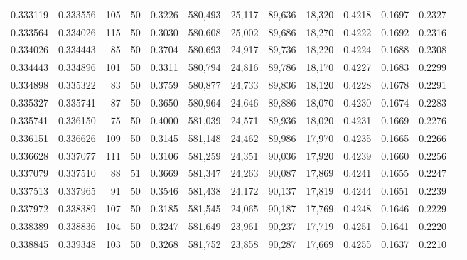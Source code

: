 \begin{tabular}{rrrrrrrrrrrrr}
0.333119 & 0.333556 &   105 &  50 &                                     0.3226 & 580,493 &  25,117 &  89,636 &  18,320 & 0.4218 & 0.1697 & 0.2327 \\
0.333564 & 0.334026 &   115 &  50 &                                     0.3030 & 580,608 &  25,002 &  89,686 &  18,270 & 0.4222 & 0.1692 & 0.2316 \\
0.334026 & 0.334443 &    85 &  50 &                                     0.3704 & 580,693 &  24,917 &  89,736 &  18,220 & 0.4224 & 0.1688 & 0.2308 \\
0.334443 & 0.334896 &   101 &  50 &                                     0.3311 & 580,794 &  24,816 &  89,786 &  18,170 & 0.4227 & 0.1683 & 0.2299 \\
0.334898 & 0.335322 &    83 &  50 &                                     0.3759 & 580,877 &  24,733 &  89,836 &  18,120 & 0.4228 & 0.1678 & 0.2291 \\
0.335327 & 0.335741 &    87 &  50 &                                     0.3650 & 580,964 &  24,646 &  89,886 &  18,070 & 0.4230 & 0.1674 & 0.2283 \\
0.335741 & 0.336150 &    75 &  50 &                                     0.4000 & 581,039 &  24,571 &  89,936 &  18,020 & 0.4231 & 0.1669 & 0.2276 \\
0.336151 & 0.336626 &   109 &  50 &                                     0.3145 & 581,148 &  24,462 &  89,986 &  17,970 & 0.4235 & 0.1665 & 0.2266 \\
0.336628 & 0.337077 &   111 &  50 &                                     0.3106 & 581,259 &  24,351 &  90,036 &  17,920 & 0.4239 & 0.1660 & 0.2256 \\
0.337079 & 0.337510 &    88 &  51 &                                     0.3669 & 581,347 &  24,263 &  90,087 &  17,869 & 0.4241 & 0.1655 & 0.2247 \\
0.337513 & 0.337965 &    91 &  50 &                                     0.3546 & 581,438 &  24,172 &  90,137 &  17,819 & 0.4244 & 0.1651 & 0.2239 \\
0.337972 & 0.338389 &   107 &  50 &                                     0.3185 & 581,545 &  24,065 &  90,187 &  17,769 & 0.4248 & 0.1646 & 0.2229 \\
0.338389 & 0.338836 &   104 &  50 &                                     0.3247 & 581,649 &  23,961 &  90,237 &  17,719 & 0.4251 & 0.1641 & 0.2220 \\
0.338845 & 0.339348 &   103 &  50 &                                     0.3268 & 581,752 &  23,858 &  90,287 &  17,669 & 0.4255 & 0.1637 & 0.2210 \\

\end{tabular}

